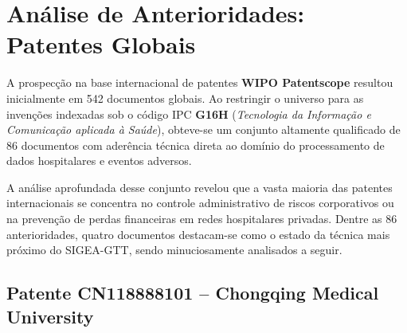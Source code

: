 \chapter{Análise de Anterioridades: Patentes Globais}
\label{cap_analise_patentes}

A prospecção na base internacional de patentes \textbf{WIPO Patentscope} resultou inicialmente em 542 documentos globais. Ao restringir o universo para as invenções indexadas sob o código IPC \textbf{G16H} (\textit{Tecnologia da Informação e Comunicação aplicada à Saúde}), obteve-se um conjunto altamente qualificado de 86 documentos com aderência técnica direta ao domínio do processamento de dados hospitalares e eventos adversos.

A análise aprofundada desse conjunto revelou que a vasta maioria das patentes internacionais se concentra no controle administrativo de riscos corporativos ou na prevenção de perdas financeiras em redes hospitalares privadas. Dentre as 86 anterioridades, quatro documentos destacam-se como o estado da técnica mais próximo do SIGEA-GTT, sendo minuciosamente analisados a seguir.

\section{Patente CN118888101 -- Chongqing Medical University}
\label{sec_patente_chongqing}


